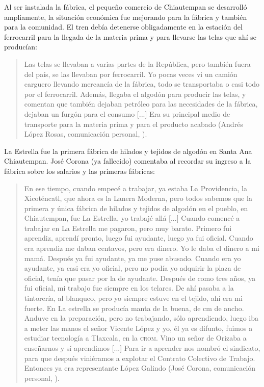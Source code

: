 \documentclass[14pt,letterpaper,twoside]{extbook} %
\begin{document}
Al ser instalada la fábrica, el pequeño comercio de Chiautempan se desarrolló ampliamente, la situación económica fue mejorando para la fábrica y también para la comunidad. El tren debía detenerse obligadamente en la estación del ferrocarril para la llegada de la materia prima y para llevarse las telas que ahí se producían:

\begin{quotation}
\noindent Las telas se llevaban a varias partes de la República, pero también fuera del país, se las llevaban por ferrocarril. Yo pocas veces vi un camión carguero llevando mercancía de la fábrica, todo se transportaba o casi todo por el ferrocarril. Además, llegaba el algodón para producir las telas, y comentan que también dejaban petróleo para las necesidades de la fábrica, dejaban un furgón para el consumo [...] Era su principal medio de transporte para la materia prima y para el producto acabado (Andrés López Rosas, comunicación personal, ).
\end{quotation}

\noindent La Estrella fue la primera fábrica de hilados y tejidos de algodón en Santa Ana Chiautempan. José Corona (ya fallecido) comentaba al recordar su ingreso a la fábrica sobre los salarios y las primeras fábricas:

\begin{quotation}
\noindent En ese tiempo, cuando empecé a trabajar, ya estaba La Providencia, la Xicoténcatl, que ahora es la Lanera Moderna, pero todos sabemos que la primera y única fábrica de hilados y tejidos de algodón en el pueblo, en Chiautempan, fue La Estrella, yo trabajé allá [...] Cuando comencé a trabajar en La Estrella me pagaron, pero muy barato. Primero fui aprendiz, aprendí pronto, luego fui ayudante, luego ya fui oficial. Cuando era aprendiz me daban  centavos, pero era dinero. Yo le daba el dinero a mi mamá. Después ya fui ayudante, ya me puse abusado. Cuando era yo ayudante, ya casi era yo oficial, pero no podía yo adquirir la plaza de oficial, tenía que pasar por la de ayudante. Después de como tres años, ya fui oficial, mi trabajo fue siempre en los telares. De ahí pasaba a la tintorería, al blanqueo, pero yo siempre estuve en el tejido, ahí era mi fuerte. En La estrella se producía manta de la buena, de  cm de ancho. Anduve en la preparación, pero no trabajando, sólo aprendiendo, luego iba a meter las manos el señor Vicente López y yo, él ya es difunto, fuimos a estudiar tecnología a Tlaxcala, en la \textsc{crom}. Vino un señor de Orizaba a enseñarnos y sí aprendimos [...] Para ir a aprender nos nombró el sindicato, para que después viniéramos a explotar el Contrato Colectivo de Trabajo. Entonces ya era representante López Galindo (José Corona, comunicación personal, ).
\end{quotation}
\end{document}
